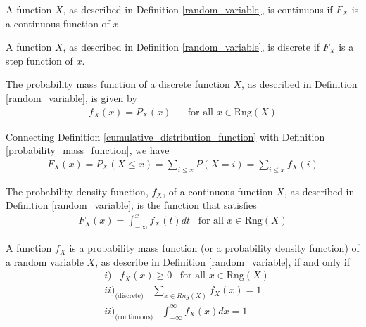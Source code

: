 \begin{definition}
A function $X$, as described in Definition \ref{random_variable}, is continuous if $F_{X}$ is a continuous function of $x$.
\end{definition}

\begin{definition}
A function $X$, as described in Definition \ref{random_variable}, is discrete if $F_{X}$ is a step function of $x$.
\end{definition}

\begin{definition}
The probability mass function of a discrete function $X$, as described in Definition \ref{random_variable}, is given by 
\begin{align*}
    f_{X}(x) = P_{X}(x) \hspace{20pt} \text{for all} \hspace{4pt} x \in \text{Rng}(X)
\end{align*}
\label{probability_mass_function}
\end{definition}

\begin{note}
Connecting Definition \ref{cumulative_distribution_function} with Definition \ref{probability_mass_function}, we have
\begin{align*}
    F_{X}(x) = P_{X}(X \leq x) = \sum_{i \leq x} P(X = i) = \sum_{i \leq x} f_{X}(i)
\end{align*}
\end{note}

\begin{definition}
The probability density function, $f_{X}$, of a continuous function $X$, as described in Definition \ref{random_variable}, is the function that satisfies 
\begin{align*}
    F_{X}(x) = \int_{-\infty}^{x} f_{X}(t) dt \hspace{10pt} \text{for all} \hspace{4pt} x \in \text{Rng}(X)
\end{align*}
\end{definition}

\begin{theorem}
A function $f_{X}$ is a probability mass function (or a probability density function) of a random variable $X$, as describe in Definition \ref{random_variable}, if and only if
\begin{align*}
    &i) \hspace{10pt} f_{X}(x) \geq 0 \hspace{10pt} \text{for all} \hspace{4pt} x \in \text{Rng}(X)\\[2ex]
    &ii)_\text{(discrete)} \hspace{10pt} \sum_{x \in Rng(X)} f_{X}(x) = 1\\[2ex]
    &ii)_\text{(continuous)} \hspace{10pt} \int_{-\infty}^{\infty} f_{X}(x) dx = 1
\end{align*}
\end{theorem}

